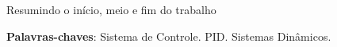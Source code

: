 \documentclass[
	12pt,				%
	openany,			%
	oneside,			%
	a4paper,			%
	english,			%
	french,				%
	spanish,			%
	brazil,				%
	]{abntex2}
\begin{document}

\frenchspacing 


\imprimircapa

\imprimirfolhaderosto*


{
\ABNTEXchapterfont



\setlength{\absparsep}{18pt} %
\begin{resumo}
 Resumindo o início, meio e fim do trabalho

 \noindent
 \textbf{Palavras-chaves}: Sistema de Controle. PID. Sistemas Dinâmicos.
\end{resumo}

\listoffigures*
\cleardoublepage

\listoftables*
\cleardoublepage



\tableofcontents*
\cleardoublepage


}
\end{document}
